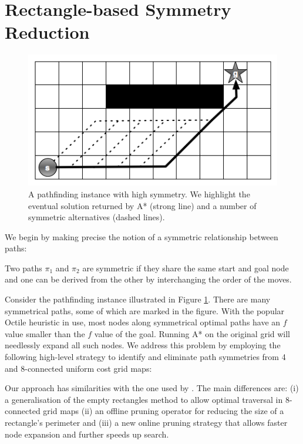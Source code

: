 \section{Rectangle-based Symmetry Reduction}
\label{sec:rsr}

\begin{figure}[]
       \begin{center}
                       \includegraphics[scale=0.36]{diagrams/symmetry_example.png}
       \end{center}
       \caption{A pathfinding instance with high symmetry. We highlight the
eventual solution returned by A* (strong line) and a number of symmetric 
alternatives (dashed lines).}
       \label{fig-symmetry}
		\vspace{-0.5em}
\end{figure}

We begin by making precise the notion of a symmetric relationship between paths:
\begin{definition}
Two paths $\pi_{1}$ and $\pi_{2}$ are symmetric if they share the same start and
goal node and one can be derived from the other by interchanging the order of the
moves.
\end{definition}

Consider the pathfinding instance illustrated in Figure \ref{fig-symmetry}.
There are many symmetrical paths, some of which are marked in the figure.  With
the popular Octile heuristic in use, most nodes along symmetrical optimal paths
have an $f$ value smaller than the $f$ value of the goal.  Running A* on the
original grid will needlessly expand all such nodes.  We address this problem by
employing the following high-level strategy to identify and eliminate path
symmetries from 4 and 8-connected uniform cost grid maps:


Our approach has similarities with the one used by
\cite{harabor10}.  The main differences are: (i) a
generalisation of the empty rectangles method to allow optimal traversal in
8-connected grid maps (ii) an offline pruning operator for reducing the size of
a rectangle's perimeter and (iii) a new online pruning strategy that allows faster
node expansion and further speeds up search.

